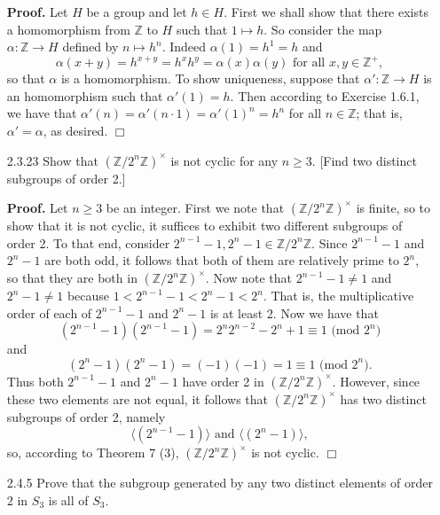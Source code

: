 \documentclass[9pt]{article}
\newcommand{\qed}{\hfill \ensuremath{\Box}}
\newcommand{\cyc}[1]{\langle #1 \rangle}
\newcommand{\Z}{\mathbb{Z}}
\begin{document}
\begin{enumerate}
      \textbf{Proof.} Let $H$ be a group and let $h \in H$. First we shall show
      that there exists a homomorphism from $\Z$ to $H$ such that $1 \mapsto h$.
      So consider the map $\alpha : \Z \rightarrow H$ defined by
      $n \mapsto h^n$. Indeed $\alpha(1) = h^1 = h$ and
      $$\alpha(x+y) = h^{x+y} = h^xh^y = \alpha(x)\alpha(y) \text{ for all }
        x, y \in \Z^+,$$
      so that $\alpha$ is a homomorphism. To show uniqueness, suppose that
      $\alpha' : \Z \rightarrow H$ is an homomorphism such that
      $\alpha'(1) = h$. Then according to Exercise 1.6.1, we have that
      $\alpha'(n) = \alpha'(n\cdot1) = \alpha'(1)^n = h^n$ for all $n \in \Z$;
      that is, $\alpha' = \alpha$, as desired. \qed
   \item[2.3.23]  Show that $(\Z/2^n\Z)^\times$ is not cyclic for any $n \ge 3$.
                  [Find two distinct subgroups of order 2.]

      \textbf{Proof.} Let $n \ge 3$ be an integer. First we note that
      $(\Z/2^n\Z)^\times$ is finite, so to show that it is not cyclic, it
      suffices to exhibit two different subgroups of order 2. To that end,
      consider $2^{n-1}-1, 2^n-1 \in \Z/2^n\Z$. Since $2^{n-1}-1$ and $2^n-1$
      are both odd, it follows that both of them are relatively prime to $2^n$,
      so that they are both in $(\Z/2^n\Z)^\times$. Now note that
      $2^{n-1}-1 \neq 1$ and $2^n-1 \neq 1$ because
      $1 < 2^{n-1}-1 < 2^n-1 < 2^n$. That is, the multiplicative order of each
      of $2^{n-1}-1$ and $2^n-1$ is at least 2. Now we have that
      $$(2^{n-1}-1)(2^{n-1}-1) = 2^n2^{n-2}-2^n + 1 \equiv 1\text{ (mod }2^n)$$
      and
      $$(2^n-1)(2^n-1) = (-1)(-1) = 1 \equiv 1\text{ (mod }2^n).$$
      Thus both $2^{n-1}-1$ and $2^n-1$ have order 2 in $(\Z/2^n\Z)^\times$.
      However, since these two elements are not equal, it follows that
      $(\Z/2^n\Z)^\times$ has two distinct subgroups of order 2, namely
      $$\cyc{(2^{n-1}-1)} \text{ and } \cyc{(2^n-1)},$$
      so, according to Theorem 7 (3), $(\Z/2^n\Z)^\times$ is not cyclic. \qed
   \item[2.4.5]   Prove that the subgroup generated by any two distinct elements
                  of order 2 in $S_3$ is all of $S_3$.


\end{enumerate}
\end{document}
